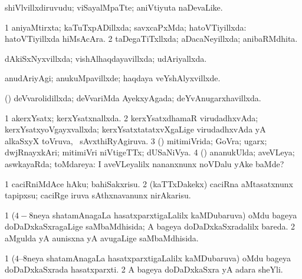 {\bentry
{} 
\gl{\nA}
\expl{}
\bmng
{} 
\emng
\eentry

\bentry
{} 
\gl{\nA}
\expl{}
\bmng
shiVlvillxdiruvudu; viSayalMpaTte; aniVtiyuta naDevaLike. 
\emng
\eentry

\bentry
{} 
\gl{\gu}
\expl{}
\bmng
\bnum
\num{1} aniyaMtirxta; kaTuTxpADillxda; savxcaPxMda; hatoVTiyillxda:  hatoVTiyillxda hiMsAcAra. 
\num{2} taDegaTiTxllxda; aDacaNeyillxda; anibaRMdhita. 
\enum
\emng
\eentry

\bentry
{} 
\gl{\gu}
\expl{}
\bmng
dAkiSxNyxvillxda; vishAlhaqdayavillxda; udAriyallxda. 
\emng
\eentry

\bentry
{} 
\gl{\kirxvi}
\expl{}
\bmng
anudAriyAgi; anukuMpavillxde; haqdaya veYshAlyxvillxde. 
\emng
\eentry

\bentry
{} 
\gl{\gu}
\expl{}
\bmng
(\deVva) deVvarolidillxda; deVvariMda AyekxyAgada; deYvAnugarxhavillxda. 
\emng
\eentry

\bentry
{} 
\gl{\gu}
\expl{}
\bmng
\bnum
\num{1} akerxYsatx; kerxYsatxnallxda. 
\num{2} kerxYsatxdhamaR virudadhxvAda; kerxYsatxyoVgayxvallxda; kerxYsatxtatatxvXgaLige virudadhxvAda yA alkaSxyX toVruva, \kanmu\ sAvxthiRyAgiruva. 
\num{3} (\AmA) mitimiVrida; GoVra; ugarx; dwjRnayxkAri; mitimiVri niVtigeTTx; dUSaNiVya. 
\num{4} (\AmA) ananukUlda; aveVLeya; aswkayaRda; toMdareya:  I aveVLeyalilx nananxnunx noVDalu yAke baMde? 
\enum
\emng
\eentry

\bentry
{} 
\gl{\sakirx}
\expl{}
\bmng
\bnum
\num{1} caciRniMdAce hAku; bahiSakxrisu. 
\num{2} (kaTTxDakekx) caciRna aMtasatxnunx tapipxsu; caciRge iruva sAthxnavanunx nirAkarisu. 
\enum
\emng
\eentry

\bentry
{} 
\gl{\gu}
\expl{}
\bmng
\bnum
\num{1} ($4-8$neya shatamAnagaLa hasatxparxtigaLalilx kaMDubaruva) oMdu bageya doDaDxkaSxragaLige saMbaMdhisida; A bageya doDaDxkaSxradalilx bareda. 
\num{2} aMgulda yA aunisxna yA avugaLige saMbaMdhisida. 
\enum
\emng
\eentry

\bentry
{} 
\gl{\nA}
\expl{}
\bmng
\bnum
\num{1} ($4$--$8$neya shatamAnagaLa hasatxparxtigaLalilx kaMDubaruva) oMdu bageya doDaDxkaSxrada hasatxparxti. 
\num{2} A bageya doDaDxkaSxra yA adara sheYli. 
\enum
\emng
\eentry

}
